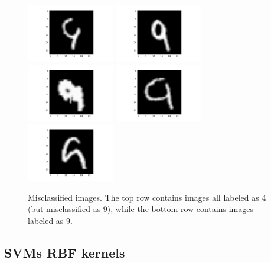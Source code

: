 \documentclass{article}
\begin{document}
\begin{multicols}{2}
\begin{figure}[t]
   \includegraphics[width=1.5in]{img/4-1-wrong/4-1-wrong-158.pdf} \hspace{-.25in}
   \includegraphics[width=1.5in]{img/4-1-wrong/4-1-wrong-224.pdf} \hspace{-.25in}
   \includegraphics[width=1.5in]{img/4-1-wrong/4-1-wrong-247.pdf} \hspace{-.25in}
   \includegraphics[width=1.5in]{img/4-1-wrong/4-1-wrong-259.pdf} \hspace{-.25in}
   \includegraphics[width=1.5in]{img/4-1-wrong/4-1-wrong-281.pdf} \hspace{-.25in}
   \caption{Misclassified images. The top row contains images all labeled as 4 (but misclassified as 9), 
   while the bottom row contains images labeled as 9.}
   \label{fig:4-1-wrong}
\end{figure}

\subsection{SVMs   RBF kernels}


\end{multicols}
\end{document}
